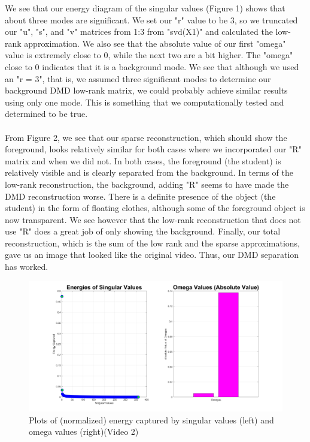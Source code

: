 \documentclass{article}
\begin{document}
We see that our energy diagram of the singular values  (Figure 1) shows that about three modes are significant. We set our "r" value to be 3, so we truncated our "u", "s", and "v" matrices from 1:3 from "svd(X1)" and calculated the low-rank approximation. We also see that the absolute value of our first "omega" value is extremely close to 0, while the next two are a bit higher. The "omega" close to 0 indicates that it is a background mode. We see that although we used an "r = 3", that is, we assumed three significant modes to determine our background DMD low-rank matrix, we could probably achieve similar results using only one mode. This is something that we computationally tested and determined to be true. \\ \\
From Figure 2, we see that our sparse reconstruction, which should show the foreground, looks relatively similar for both cases where we incorporated our "R" matrix and when we did not. In both cases, the foreground (the student) is relatively visible and is clearly separated from the background. In terms of the low-rank reconstruction, the background, adding "R" seems to have made the DMD reconstruction worse. There is a definite presence of the object (the student) in the form of floating clothes, although some of the foreground object is now transparent. We see however that the low-rank reconstruction that does not use "R" does a great job of only showing the background. Finally, our total reconstruction, which is the sum of the low rank and the sparse approximations, gave us an image that looked like the original video. Thus, our DMD separation has worked.
\begin{figure}[H]
\begin{center}
\includegraphics[width = 12cm]{energy2}
\caption{\label{fig:scaled_diss} Plots of  (normalized) energy captured by singular values (left) and omega values (right)(Video 2)}
\end{center}
\end{figure}
\end{document}
